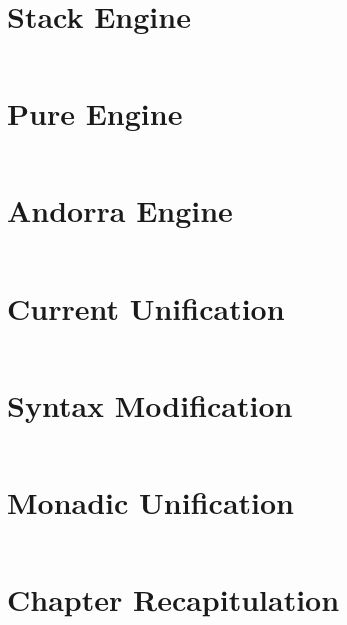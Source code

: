 \documentclass[thesis-solanki.tex]{files}
\begin{document}
\section{Stack Engine}
\begin{singlespace}
\inputminted[linenos]{haskell}{haskell-proto3-sudsy-woe.hs}
\end{singlespace}

\section{Pure Engine}
\begin{singlespace}
\inputminted[linenos]{haskell}{haskell-proto3-absurd-silicon.hs}
\end{singlespace}

\section{Andorra Engine}
\begin{singlespace}
\inputminted[linenos]{haskell}{haskell-proto3-diatomic-unbank.hs}
\end{singlespace}

\section{Current Unification}
\begin{singlespace}
  \inputminted[linenos]{haskell}{haskell-proto3-pentyl-skater.hs}
\end{singlespace}


\section{Syntax Modification}
\begin{singlespace}
  \inputminted[linenos]{haskell}{haskell-proto3-uplift-apart.hs}
\end{singlespace}

\section{Monadic Unification}
\begin{singlespace}
  \inputminted[linenos]{haskell}{haskell-proto3-bevy-icebox.hs}
\end{singlespace}


\section{Chapter Recapitulation}
\end{document}
